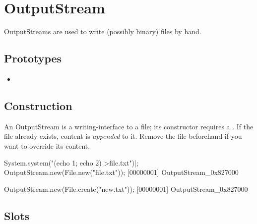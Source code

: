 \section{OutputStream}

OutputStreams are used to write (possibly binary) files by hand.

\subsection{Prototypes}
\begin{itemize}
\item {}
\end{itemize}

\subsection{Construction}

An OutputStream is a writing-interface to a file; its constructor
requires a .  If the file already exists, content is
\emph{appended} to it.  Remove the file beforehand if you want to
override its content.

\begin{urbiscript}[firstnumber=1]
System.system("(echo 1; echo 2) >file.txt")|;
OutputStream.new(File.new("file.txt"));
[00000001] OutputStream_0x827000

OutputStream.new(File.create("new.txt"));
[00000001] OutputStream_0x827000
\end{urbiscript}

\subsection{Slots}

